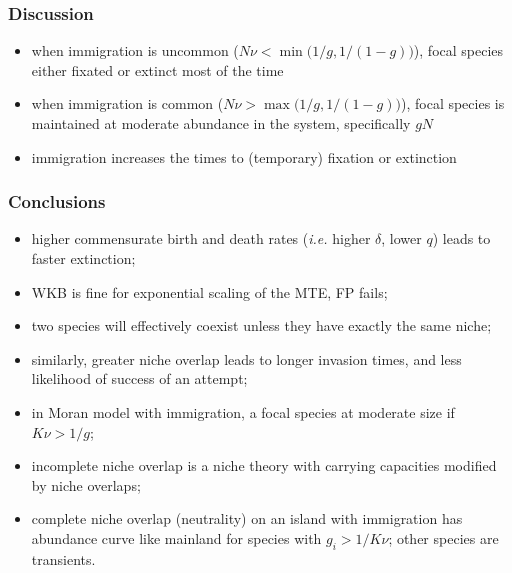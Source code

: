 \documentclass{beamer}
\begin{document}
\begin{frame}
\frametitle{Discussion}
\begin{itemize}
\item when immigration is uncommon ($N\nu < \min\big(1/g,1/(1-g)\big)$), focal species either fixated or extinct most of the time
\item when immigration is common ($N\nu > \max\big(1/g,1/(1-g)\big)$), focal species is maintained at moderate abundance in the system, specifically $gN$%
\item immigration increases the times to (temporary) fixation or extinction%
\end{itemize}
\end{frame}


\begin{frame}
\frametitle{Conclusions}
\begin{itemize}
	\item higher commensurate birth and death rates (\emph{i.e.} higher $\delta$, lower $q$) leads to faster extinction; 
	\pause
	\item WKB is fine for exponential scaling of the MTE, FP fails; 
	\pause
	\item two species will effectively coexist unless they have exactly the same niche; 
	\item similarly, greater niche overlap leads to longer invasion times, and less likelihood of success of an attempt; 
	\pause
	\item in Moran model with immigration, a focal species at moderate size if $K\nu > 1/g$; 
	\pause
	\item incomplete niche overlap is a niche theory with carrying capacities modified by niche overlaps;
	\item complete niche overlap (neutrality) on an island with immigration has abundance curve like mainland for species with $g_i>1/K\nu$; other species are transients. 
\end{itemize}
\end{frame}
\end{document}
